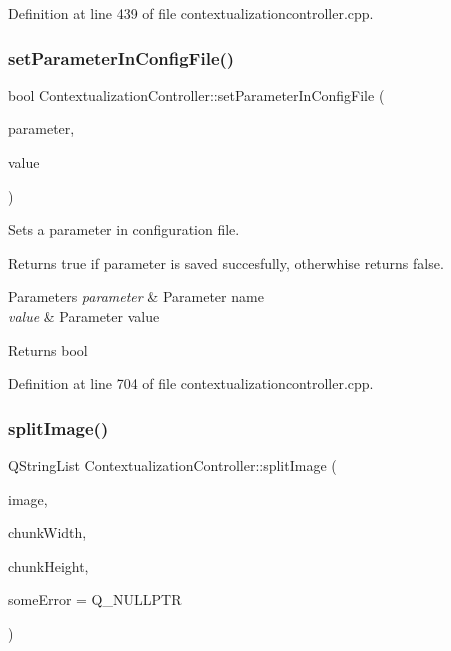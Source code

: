 Definition at line 439 of file contextualizationcontroller.\+cpp.

\mbox{\label{classContextualizationController_a6e92320baf8dbbf148bd3b3e97c5d332}} 
\subsubsection{\texorpdfstring{set\+Parameter\+In\+Config\+File()}{setParameterInConfigFile()}}
{\footnotesize\ttfamily bool Contextualization\+Controller\+::set\+Parameter\+In\+Config\+File (\begin{DoxyParamCaption}\item[{const Q\+String}]{parameter,  }\item[{const Q\+String}]{value }\end{DoxyParamCaption})\hspace{0.3cm}{\ttfamily [protected]}}



Sets a parameter in configuration file. 

Returns true if parameter is saved succesfully, otherwhise returns false. 
\begin{DoxyParams}{Parameters}
{\em parameter} & Parameter name \\
\hline
{\em value} & Parameter value \\
\hline
\end{DoxyParams}
\begin{DoxyReturn}{Returns}
bool 
\end{DoxyReturn}


Definition at line 704 of file contextualizationcontroller.\+cpp.

\mbox{\label{classContextualizationController_a2bef3de188caf57cad70e47bcf7495d1}} 
\subsubsection{\texorpdfstring{split\+Image()}{splitImage()}}
{\footnotesize\ttfamily Q\+String\+List Contextualization\+Controller\+::split\+Image (\begin{DoxyParamCaption}\item[{const Q\+String \&}]{image,  }\item[{int}]{chunk\+Width,  }\item[{int}]{chunk\+Height,  }\item[{bool $\ast$}]{some\+Error = {\ttfamily Q\+\_\+NULLPTR} }\end{DoxyParamCaption})\hspace{0.3cm}{\ttfamily [protected]}}



